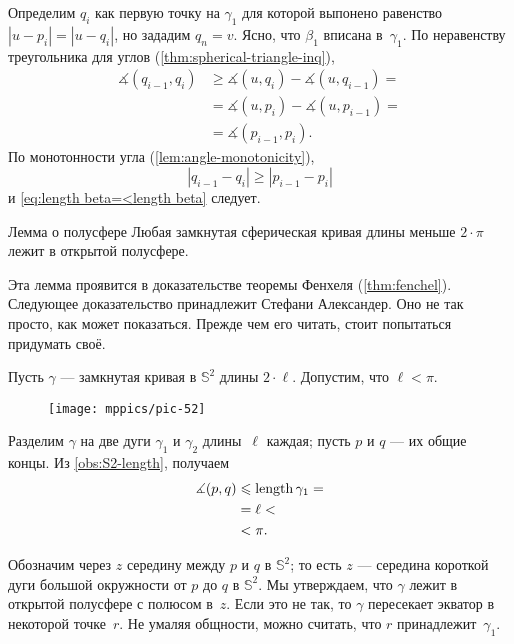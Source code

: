 Определим $q_i$ как первую точку на $\gamma_1$ для которой выпонено равенство $|u-p_i|=|u-q_i|$, но зададим $q_n=v$.
Ясно, что $\beta_1$ вписана в~$\gamma_1$.
По неравенству треугольника для углов (\ref{thm:spherical-triangle-inq}),
\begin{align*}
 \measuredangle(q_{i-1},q_i) &\ge  \measuredangle (u, q_i) - \measuredangle ( u , q_{i-1})  =
\\
&= \measuredangle (u,p_i) - \measuredangle (u,p_{i-1}) =
\\
& = \measuredangle(p_{i-1},p_i).
\end{align*}
По монотонности угла (\ref{lem:angle-monotonicity}),
\[|q_{i-1}-q_i|\ge|p_{i-1}-p_i|\]
и \ref{eq:length beta=<length beta} следует.
\qeds


\begin{thm}{Лемма о полусфере}\label{lem:hemisphere}
Любая замкнутая сферическая кривая длины меньше $2\cdot \pi$ лежит в открытой полусфере.
\end{thm}

Эта лемма проявится в доказательстве теоремы Фенхеля (\ref{thm:fenchel}).
Следующее доказательство принадлежит Стефани Александер.
Оно не так просто, как может показаться.
Прежде чем его читать, стоит попытаться придумать своё.

Пусть $\gamma$ --- замкнутая кривая в $\mathbb{S}^2$ длины $2\cdot\ell$.
Допустим, что $\ell<\pi$.

{

\begin{wrapfigure}{o}{35mm}
\vskip-3mm
\centering
\texttt{[image: mppics/pic-52]}
\end{wrapfigure}

Разделим $\gamma$ на две дуги $\gamma_1$ и $\gamma_2$ длины~$\ell$ каждая;
пусть $p$ и $q$ --- их общие концы.
Из \ref{obs:S2-length}, получаем
\begin{align*}
\measuredangle(p,q)&\leqslant \mathop{\rm length}\nolimits \gamma_1=
\\
&= \ell<
\\
&<\pi.
\end{align*}

}

Обозначим через $z$ середину между $p$ и $q$ в $\mathbb{S}^2$;
то есть $z$ --- середина короткой дуги большой окружности от $p$ до $q$ в $\mathbb{S}^2$.
Мы утверждаем, что $\gamma$ лежит в открытой полусфере с полюсом в~$z$.
Если это не так, то $\gamma$ пересекает экватор в некоторой точке~$r$.
Не умаляя общности, можно считать, что $r$ принадлежит~$\gamma_1$.

